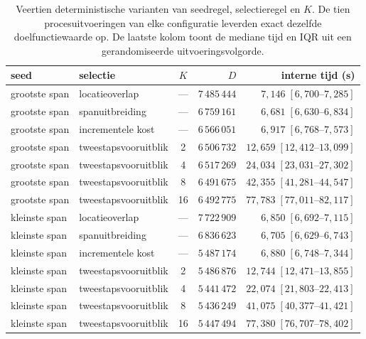 \begin{table}[H]
\centering
\caption{Veertien deterministische varianten van seedregel, selectieregel en
$K$. De tien procesuitvoeringen van elke configuratie leverden exact dezelfde
doelfunctiewaarde op. De laatste kolom toont de mediane tijd en IQR uit een
gerandomiseerde uitvoeringsvolgorde.}
\label{tab:app-seed}
\begin{tabular}{@{}llcrr@{}}
\toprule
\textbf{seed} & \textbf{selectie} & \textbf{$K$} & \textbf{$D$} &
\textbf{interne tijd (s)} \\
\midrule
grootste span & locatieoverlap       & --- & $7\,485\,444$ & $7,146\;[6,700\text{--}7,285]$ \\
grootste span & spanuitbreiding      & --- & $6\,759\,161$ & $6,681\;[6,630\text{--}6,834]$ \\
grootste span & incrementele kost    & --- & $6\,566\,051$ & $6,917\;[6,768\text{--}7,573]$ \\
grootste span & tweestapsvooruitblik & 2   & $6\,506\,732$ & $12,659\;[12,412\text{--}13,099]$ \\
grootste span & tweestapsvooruitblik & 4   & $6\,517\,269$ & $24,034\;[23,031\text{--}27,302]$ \\
grootste span & tweestapsvooruitblik & 8   & $6\,491\,675$ & $42,355\;[41,281\text{--}44,547]$ \\
grootste span & tweestapsvooruitblik & 16  & $6\,492\,775$ & $77,783\;[77,011\text{--}82,117]$ \\
\midrule
kleinste span & locatieoverlap       & --- & $7\,722\,909$ & $6,850\;[6,692\text{--}7,115]$ \\
kleinste span & spanuitbreiding      & --- & $6\,836\,623$ & $6,705\;[6,629\text{--}6,743]$ \\
kleinste span & incrementele kost    & --- & $5\,487\,174$ & $6,880\;[6,748\text{--}7,344]$ \\
kleinste span & tweestapsvooruitblik & 2   & $5\,486\,876$ & $12,744\;[12,471\text{--}13,855]$ \\
kleinste span & tweestapsvooruitblik & 4   & $5\,441\,472$ & $22,074\;[21,803\text{--}22,413]$ \\
kleinste span & tweestapsvooruitblik & 8   & $5\,436\,249$ & $41,075\;[40,377\text{--}41,421]$ \\
kleinste span & tweestapsvooruitblik & 16  & $5\,447\,494$ & $77,380\;[76,707\text{--}78,402]$ \\
\bottomrule
\end{tabular}
\end{table}

